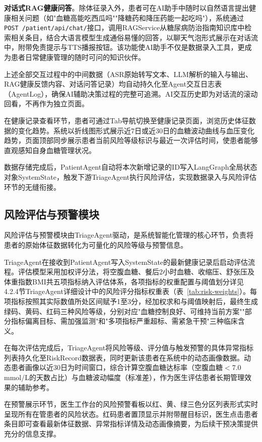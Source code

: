 \textbf{对话式RAG健康问答}。除体征录入外，患者可在AI助手中随时以自然语言提出健康相关问题（如"血糖高能吃西瓜吗""降糖药和降压药能一起吃吗"），系统通过\texttt{POST /patient/api/chat/}接口，调用RAGService从糖尿病防治指南知识库中检索相关条目，结合大语言模型生成通俗易懂的回答，以聊天气泡形式展示在对话流中，附带免责提示与TTS播报按钮。该功能使AI助手不仅是数据录入工具，更成为患者日常健康管理的随时可问的知识伙伴。

上述全部交互过程中的中间数据（ASR原始转写文本、LLM解析的输入与输出、RAG健康反馈内容、对话问答记录）均自动持久化至Agent交互日志表（AgentLog），确保AI辅助决策过程的完整可追溯。AI交互历史即为对话流的滚动回看，不再作为独立页面。

在健康记录查看环节，患者可通过Tab导航切换至健康记录页面，浏览历史体征数据的变化趋势。系统以折线图形式展示近7日或近30日的血糖波动曲线与血压变化趋势，页面顶部同步展示患者当前风险等级标识与最近一次评估时间，使患者能够直观感知自身血糖管理状况。

数据存储完成后，PatientAgent自动将本次新增记录的ID写入LangGraph全局状态对象SystemState，触发下游TriageAgent执行风险评估，实现数据录入与风险评估环节的无缝衔接。


\subsection{风险评估与预警模块}

风险评估与预警模块由TriageAgent驱动，是系统智能化管理的核心环节，负责将患者的原始体征数据转化为可量化的风险等级与预警信息。

TriageAgent在接收到PatientAgent写入SystemState的最新健康记录后启动评估流程。评估模型采用加权评分法，将空腹血糖、餐后2小时血糖、收缩压、舒张压及体重指数BMI共五项指标纳入评估体系，各项指标的权重配置与阈值划分详见4.2.4节TriageAgent详细设计中的风险评分指标权重表（表~\ref{tab:risk-weights}）。每项指标按照其实际数值所处区间赋予1至3分，经加权求和与阈值映射后，最终生成绿码、黄码、红码三种风险等级，分别对应"血糖控制良好、可维持当前方案""部分指标偏离目标、需加强监测"和"多项指标严重超标、需紧急干预"三种临床含义。

在每次评估完成后，TriageAgent将风险等级、评分值与触发预警的具体异常指标列表持久化至RiskRecord数据表，同时更新该患者在系统中的动态画像数据。动态患者画像以近30日为时间窗口，综合计算空腹血糖达标率（空腹血糖$<$7.0 mmol/L的天数占比）与血糖波动幅度（标准差），作为医生评估患者长期管理效果的辅助参考。

在预警展示环节，医生工作台的风险预警看板以红、黄、绿三色分区列表形式实时呈现所有在管患者的风险状态。红码患者置顶显示并附带醒目标识，医生点击患者条目即可查看最新体征数据、异常指标详情及动态画像摘要，为后续干预决策提供充分的信息支撑。

